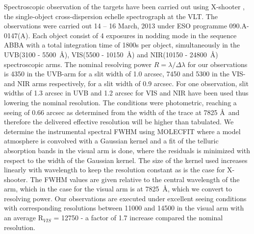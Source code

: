\documentclass{aa}    %
\newcommand{\figref}[1]{\ref{fig:#1}}
\newcommand{\Fig}[1]{\figurename~\figref{#1}}
\newcommand{\fig}[1]{\Fig{#1}}
\newcommand{\figlabel}[1]{\label{fig:#1}}
\begin{document}
Spectroscopic observation of the targets have been carried out using X-shooter
\citep{Vernet2011}, the single-object cross-dispersion echelle spectrograph at
the VLT. The observations were carried out 14 -- 16 March, 2013 under ESO
programme 090.A-0147(A). Each object consist of 4 exposures in nodding mode in
the sequence ABBA with a total integration time of 1800s per object,
simultaneously in the UVB(3100 - 5500~\AA), VIS(5500 - 10150~\AA)  and NIR(10150
- 24800~\AA) spectroscopic arms. The nominal resolving power $R = \lambda /
\Delta \lambda$ for our observations is 4350 in the UVB-arm for a slit width of
1.0 arcsec, 7450 and 5300 in the VIS- and NIR arms respectively, for a slit
width of 0.9 arcsec. For one observation, slit widths of 1.3 arcsec in UVB and
1.2 arcsec for VIS and NIR have been used thus lowering the nominal resolution.
The conditions were photometric, reaching a seeing of 0.66 arcsec as determined
from the width of the trace at 7825 \AA~and therefore the delivered effective
resolution will be higher than tabulated. We determine the instrumental spectral
FWHM using MOLECFIT \citep{Smette2015, Kausch2015} where a model atmosphere is
convolved with a Gaussian kernel and a fit of the telluric absorption bands in
the visual arm is done, where the residuals is minimized with respect to the
width of the Gaussian kernel. The size of the kernel used increases linearly
with wavelength to keep the resolution constant as is the case for X-shooter.
The FWHM values are given relative to the central wavelength of the arm, which
in the case for the visual arm is at 7825~\AA, which we convert to resolving
power.
Our observations are executed under excellent seeing conditions with
corresponding resolutions between 11000 and 14500 in the visual arm with an
average R$_{VIS}$ = 12750 - a factor of 1.7 increase compared the nominal
resolution. 
\end{document}
